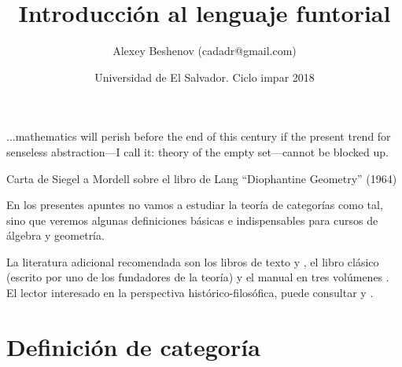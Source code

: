 \documentclass{article}
\author{Alexey Beshenov (cadadr@gmail.com)}
\title{Introducción al lenguaje funtorial}
\date{Universidad de El Salvador. Ciclo impar 2018}
\numberwithin{equation}{section}
\theoremstyle{definition}
\begin{document}
{\normalfont\sffamily\bfseries \maketitle}

\epigraph{...mathematics will perish before the end of this century if the
  present trend for senseless abstraction---I call it: theory of the empty
  set---cannot be blocked up.}{Carta de Siegel a Mordell sobre el libro de Lang
  ``Diophantine Geometry'' (1964)}

En los presentes apuntes no vamos a estudiar la teoría de categorías como tal,
sino que veremos algunas definiciones básicas e indispensables para cursos de
álgebra y geometría.

La literatura adicional recomendada son los libros de texto
\cite{Leinster-Basic} y \cite{Riehl-Context}, el libro clásico \cite{MacLane}
(escrito por uno de los fundadores de la teoría) y el manual en tres volúmenes
\cite{Borceux-1,Borceux-2,Borceux-3}. El lector interesado en la perspectiva
histórico-filosófica, puede consultar \cite{Marquis-geometrical-POV} y
\cite{Kromer-Tool-and-Object}.

\tableofcontents

\pagebreak

\section{Definición de categoría}

\end{document}
